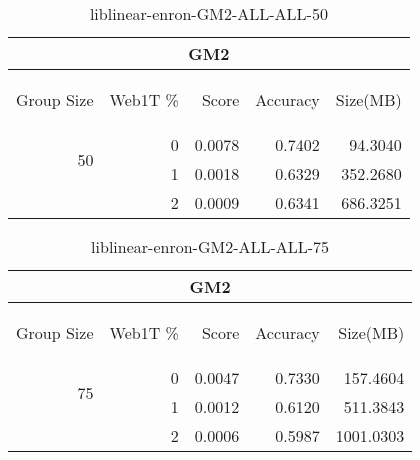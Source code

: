 \begin{center}
\begin{table}[htbp]
\begin{tabular}{ | r | r | r | r | r |}
\hline
\multicolumn{5}{|c|}{GM2}\\
\hline
\begin{sideways}Group Size\end{sideways} & \begin{sideways}Web1T \%\end{sideways} & \begin{sideways}Score\end{sideways} & \begin{sideways}Accuracy\end{sideways} & \begin{sideways}Size(MB)\end{sideways}\\
\hline
\multirow{2}{*}{50}
 & 0 & 0.0078 & 0.7402 & 94.3040\\ \cline{2-5}
 & 1 & 0.0018 & 0.6329 & 352.2680\\ \cline{2-5}
 & 2 & 0.0009 & 0.6341 & 686.3251\\ \cline{2-5}
\hline
\end{tabular}
\caption{liblinear-enron-GM2-ALL-ALL-50}
\label{table:liblinear-enron-GM2-ALL-ALL-50}
\end{table}
\end{center}

\begin{center}
\begin{table}[htbp]
\begin{tabular}{ | r | r | r | r | r |}
\hline
\multicolumn{5}{|c|}{GM2}\\
\hline
\begin{sideways}Group Size\end{sideways} & \begin{sideways}Web1T \%\end{sideways} & \begin{sideways}Score\end{sideways} & \begin{sideways}Accuracy\end{sideways} & \begin{sideways}Size(MB)\end{sideways}\\
\hline
\multirow{2}{*}{75}
 & 0 & 0.0047 & 0.7330 & 157.4604\\ \cline{2-5}
 & 1 & 0.0012 & 0.6120 & 511.3843\\ \cline{2-5}
 & 2 & 0.0006 & 0.5987 & 1001.0303\\ \cline{2-5}
\hline
\end{tabular}
\caption{liblinear-enron-GM2-ALL-ALL-75}
\label{table:liblinear-enron-GM2-ALL-ALL-75}
\end{table}
\end{center}

